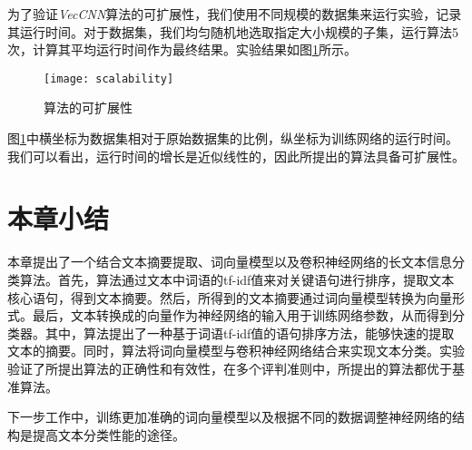 为了验证\textit{VecCNN}算法的可扩展性，我们使用不同规模的数据集来运行实验，记录其运行时间。对于数据集，我们均匀随机地选取指定大小规模的子集，运行算法5次，计算其平均运行时间作为最终结果。实验结果如图\ref{fig:scalability}所示。

\begin{figure}[!htbp]
    \centering
    \texttt{[image: scalability]}
    \caption{算法的可扩展性}
    \label{fig:scalability}
\end{figure}

图\ref{fig:scalability}中横坐标为数据集相对于原始数据集的比例，纵坐标为训练网络的运行时间。我们可以看出，运行时间的增长是近似线性的，因此所提出的算法具备可扩展性。
\section{本章小结}
\label{sec3:conclusion}
本章提出了一个结合文本摘要提取、词向量模型以及卷积神经网络的长文本信息分类算法。首先，算法通过文本中词语的tf-idf值来对关键语句进行排序，提取文本核心语句，得到文本摘要。然后，所得到的文本摘要通过词向量模型转换为向量形式。最后，文本转换成的向量作为神经网络的输入用于训练网络参数，从而得到分类器。其中，算法提出了一种基于词语tf-idf值的语句排序方法，能够快速的提取文本的摘要。同时，算法将词向量模型与卷积神经网络结合来实现文本分类。实验验证了所提出算法的正确性和有效性，在多个评判准则中，所提出的算法都优于基准算法。

下一步工作中，训练更加准确的词向量模型以及根据不同的数据调整神经网络的结构是提高文本分类性能的途径。